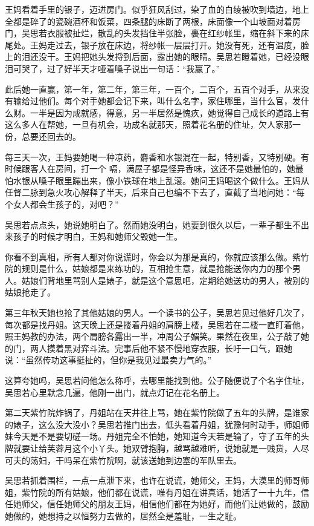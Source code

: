 王妈看着手里的银子，迈进房门。似乎狂风刮过，染了血的白绫被吹到墙边，地上全都是碎了的瓷碗酒杯和饭菜，四条腿的床断了两根，床面像一个山坡面对着房门，吴思若衣服被扯烂，散乱的头发挡住半张脸，裹在红纱帐里，缩在斜下来的床尾处。王妈走过去，银子放在床边，将纱帐一层层打开。她没有死，还有温度，脸上的泪还没干。王妈把她头发捋到后面，露出她的眼睛。吴思若瞪着她，已经没眼泪可哭了，过了好半天才哑着嗓子说出一句话：“我赢了。”

此后她一直赢，第一年，第二年，第三年，一百个，二百个，五百个对手，从来没有输给过他们。每个对手她都会记下来，叫什么名字，家住哪里，当什么官，发什么财。一半是因为成就感，得意，另一半居然是愧疚，她觉得自己成长的道路上有这么多人在帮她，一旦有机会，功成名就那天，照着花名册的住址，欠人家那一份，总要还回去的。

每三天一次，王妈要她喝一种凉药，麝香和水银混在一起，特别香，又特别硬。有时候跟客人在房间，打一个
嗝，满屋子都是怪异香味，这还不是她最怕的，她最怕水银从嗓子眼里蹦出来，像小铁球在地上乱滚。她问王妈喝这个做什么。王妈从任督二脉到急火攻心解释了半天，后来自己也编不下去了，直截了当地问她：“每个女人都会生孩子的，对吧？”

吴思若点点头，她说她明白了。然而她没明白，她要到很久以后，一辈子都生不出来孩子的时候才明白，王妈和她师父毁她一生。

你看不到真相，所有人都对你说谎时，你会以为那是真的，你就应该那么做。紫竹院的规则是什么，姑娘都是来练功的，互相抢生意，就是抢能送你内力的那个男人。姑娘们背地里骂别人是婊子，就是这个意思吧，定期给她送功的男人，被别的姑娘抢走了。

第三年秋天她也抢了其他姑娘的男人。一个读书的公子，吴思若见过他好几次了，每次都是找丹姐。这天晚上还是搂着丹姐的肩膀上楼，吴思若在二楼一直盯着他，照王妈教的办法，两个肩膀各露出一半，冲周公子媚笑。果然在夜里，公子敲了她的门，两人摸着黑对弈斗法。完事后他不紧不慢地穿衣服，长吁一口气，跟她说：“虽然传功这事挺扯的，但你是我见过最卖力气的。”

这算夸她吗，吴思若问他怎么称呼，去哪里能找到他。公子随便说了个名字住址，吴思若心里默念几遍，他刚一出门，就点灯记在花名册上。

第二天紫竹院炸锅了，丹姐站在天井往上骂，她在紫竹院做了五年的头牌，是谁家的婊子，这么没大没小？吴思若推门出去，低头看着丹姐，犹豫何时动手，师姐师妹今天是不是要切磋一场。丹姐完全不怕她，她知道今天若是输了，守了五年的头牌就要让给芙蓉月这个小丫头。她双臂抱胸，越骂越难听，说她就是一贱货，人尽可夫的荡妇，干吗呆在紫竹院啊，就该送她到边塞的军队里去。

吴思若抓着围栏，一点一点泄下来，也许在说谎，她师父，王妈，大漠里的师哥师姐，紫竹院的所有姑娘，他们都在说谎，唯有丹姐在讲真话，她活了一十九年，信任她师父，信任她师父的朋友王妈，相信他们都在为她好，而他们让她做的，鼓励她做的，她想持之以恒努力去做的，居然全是羞耻，一生之耻。
\newline

